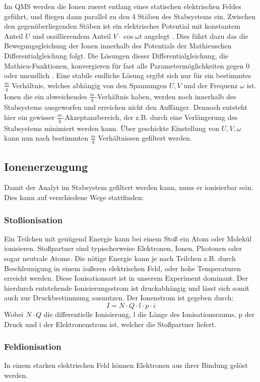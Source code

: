 Im QMS werden die Ionen zuerst entlang eines statischen elektrischen Feldes geführt, und fliegen dann parallel zu den 4 Stäben des Stabsystems ein. Zwischen den gegenüberliegenden Stäben ist ein elektrisches Potential mit konstantem Anteil $U$ und oszillierendem Anteil $V\cdot\cos{\omega t}$ angelegt \cite{QMS}. Dies führt dazu das die Bewegungsgleichung der Ionen innerhalb des Potentials der Mathieuschen Differentialgleichung folgt. Die Lösungen dieser Differentialgleichung, die Mathieu-Funktionen, konvergieren für fast alle Parametermöglichkeiten gegen 0 oder unendlich \cite{MathieuscheDiff}. Eine stabile endliche Lösung ergibt sich nur für ein bestimmtes $\frac{m}{q}$ Verhältnis, welches abhängig von den Spannungen $U,V$ und der Frequenz $\omega$ ist. Ionen die ein abweichendes $\frac{m}{q}$-Verhältnis haben, werden noch innerhalb des Stabsystems ausgeworfen und erreichen nicht den Auffänger. Dennoch entsteht hier ein gewisser $\frac{m}{q}$-Akzeptanzbereich, der z.B. durch eine Verlängerung des Stabsystems minimiert werden kann. Über geschickte Einstellung von $U,V, \omega$ kann nun nach bestimmten $\frac{m}{q}$ Verhältnissen gefiltert werden. 
\subsection{Ionenerzeugung}
Damit der Analyt im Stabsystem gefiltert werden kann, muss er ionisierbar sein. Dies kann auf verschiedene Wege stattfinden: 
\subsubsection{Stoßionisation}
Ein Teilchen mit genügend Energie kann bei einem Stoß ein Atom oder Molekül ionisieren. Stoßpartner sind typischerweise Elektronen, Ionen, Photonen oder sogar neutrale Atome. Die nötige Energie kann je nach Teilchen z.B. durch Beschleunigung in einem äußeren elektrischen Feld, oder hohe Temperaturen erreicht werden\cite{Stoßion}. Diese Ionisationsart ist in unserem Experiment dominant. Der hierdurch entstehende Ionisierungsstrom ist druckabhängig und lässt sich somit auch zur Druckbestimmung ausnutzen. 
Der Ionenstrom ist gegeben durch:
$$I = N\cdot Q \cdot l \cdot p \cdot i$$
Wobei $N\cdot Q$ die differentielle Ionisierung, l die Länge des Ionisationsraums, p der Druck und i der Elektronenstrom ist, welcher die Stoßpartner liefert\cite{VorbereitungsMappe}.
\subsubsection{Feldionisation}
In einem starken elektrischen Feld können Elektronen aus ihrer Bindung gelöst werden.
